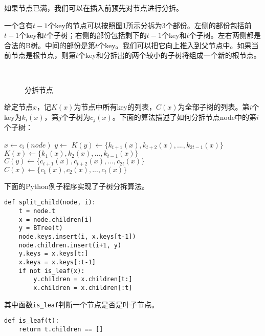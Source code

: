 \documentclass{ctexart}
\begin{document}
如果节点已满，我们可以在插入前预先对节点进行分拆。

一个含有$t-1$个key的节点可以按照图\ref{fig:node-split}所示分拆为3个部份。左侧的部份包括前$t-1$个key和$t$个子树；右侧的部份包括剩下的$t-1$个key和$t$个子树。左右两侧都是合法的B树。中间的部份是第$t$个key。我们可以把它向上推入到父节点中。如果当前节点是根节点，则第$t$个key和分拆出的两个较小的子树将组成一个新的根节点。

\begin{figure}[htbp]
  \centering
   \\
  \caption{分拆节点}
  \label{fig:node-split}
\end{figure}

给定节点$x$，记$K(x)$为节点中所有key的列表，$C(x)$为全部子树的列表。第$i$个key为$k_i(x)$，第$j$个子树为$c_j(x)$。下面的算法描述了如何分拆节点node中的第$i$个子树：

\begin{algorithmic}[1]
  \State $x \gets c_i(node)$
  \State $y \gets$ 
  \State {}
  \State {}
  \State $K(y) \gets \{k_{t+1}(x), k_{t+2}(x), ..., k_{2t-1}(x)\}$
  \State $K(x) \gets \{k_1(x), k_2(x), ..., k_{t-1}(x)\}$
    \State $C(y) \gets \{c_{t+1}(x), c_{t+2}(x), ..., c_{2t}(x)\}$
    \State $C(x) \gets \{c_1(x), c_2(x), ..., c_t(x)\}$
  \EndIf
\EndProcedure
\end{algorithmic}

下面的Python例子程序实现了子树分拆算法。

\lstset{language=Python}
\begin{lstlisting}
def split_child(node, i):
    t = node.t
    x = node.children[i]
    y = BTree(t)
    node.keys.insert(i, x.keys[t-1])
    node.children.insert(i+1, y)
    y.keys = x.keys[t:]
    x.keys = x.keys[:t-1]
    if not is_leaf(x):
        y.children = x.children[t:]
        x.children = x.children[:t]
\end{lstlisting}

其中函数\texttt{is\_leaf}判断一个节点是否是叶子节点。

\lstset{language=Python}
\begin{lstlisting}
def is_leaf(t):
    return t.children == []
\end{lstlisting}

\end{document}
